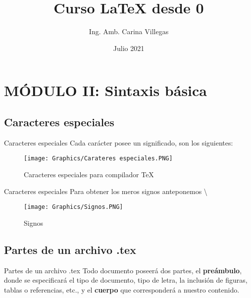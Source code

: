 \documentclass{beamer}
\title{Curso \LaTeX{} desde 0}
\author{Ing. Amb. Carina Villegas}
\date{Julio 2021}
\begin{document}
\frame{\titlepage}

\section{MÓDULO II: Sintaxis básica}
\subsection{Caracteres especiales}
\begin{frame}{Caracteres especiales}
Cada carácter posee un significado, son los siguientes:
\begin{figure}
    \centering
    \texttt{[image: Graphics/Carateres especiales.PNG]}
    \caption {Caracteres especiales para compilador \TeX{}}
    \label{fig:my_label}
\end{figure}
\end{frame}

\begin{frame}{Caracteres especiales}
   Para obtener los meros signos anteponemos \textbackslash
 \begin{figure}
     \centering
     \texttt{[image: Graphics/Signos.PNG]}
     \caption{Signos}
     \label{fig:my_label}
 \end{figure}
\end{frame}

\subsection{Partes de un archivo .tex}
\begin{frame}{Partes de un archivo .tex}
\justifying
Todo documento poseerá dos partes, el \textbf{preámbulo}, donde se especificará el tipo de documento, tipo de letra, la inclusión de figuras, tablas o referencias, etc., y el \textbf{cuerpo} que corresponderá a nuestro contenido.\\
\end{frame}
\end{document}
